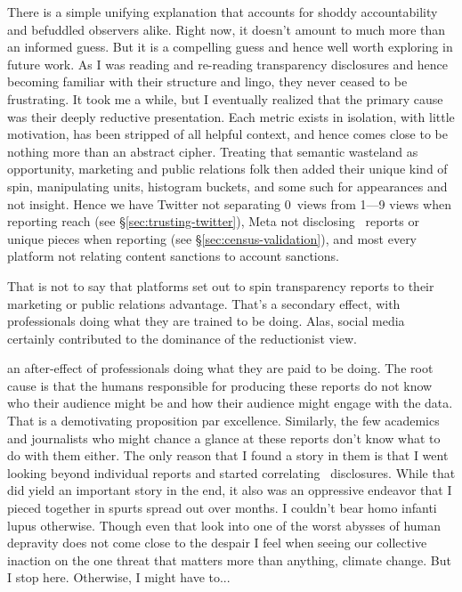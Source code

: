 There is a simple unifying explanation that accounts for shoddy accountability
and befuddled observers alike. Right now, it doesn't amount to much more than an
informed guess. But it is a compelling guess and hence well worth exploring in
future work. As I was reading and re-reading transparency disclosures and hence
becoming familiar with their structure and lingo, they never ceased to be
frustrating. It took me a while, but I eventually realized that the primary
cause was their deeply reductive presentation. Each metric exists in isolation,
with little motivation, has been stripped of all helpful context, and hence
comes close to be nothing more than an abstract cipher. Treating that semantic
wasteland as opportunity, marketing and public relations folk then added their
unique kind of spin, manipulating units, histogram buckets, and some such for
appearances and not insight. Hence we have Twitter not separating 0~views from
1—9 views when reporting reach (see \S\ref{sec:trusting-twitter}), Meta not
disclosing \NCMEC\ reports or unique pieces when reporting \CSAM (see
\S\ref{sec:census-validation}), and most every platform not relating content
sanctions to account sanctions.

That is not to say that platforms set out to spin transparency reports to their
marketing or public relations advantage. That's a secondary effect, with
professionals doing what they are trained to be doing. Alas, social media
certainly contributed to the dominance of the reductionist view.



an after-effect of
professionals doing what they are paid to be doing. The root cause is that the
humans responsible for producing these reports do not know who their audience
might be and how their audience might engage with the data. That is a
demotivating proposition par excellence. Similarly, the few academics and
journalists who might chance a glance at these reports don't know what to do
with them either. The only reason that I found a story in them is that I went
looking beyond individual reports and started correlating \CSAM\ disclosures.
While that did yield an important story in the end, it also was an oppressive
endeavor that I pieced together in spurts spread out over months. I couldn't
bear homo infanti lupus otherwise. Though even that look into one of the worst
abysses of human depravity does not come close to the despair I feel when seeing
our collective inaction on the one threat that matters more than anything,
climate change. But I stop here. Otherwise, I might have to...


